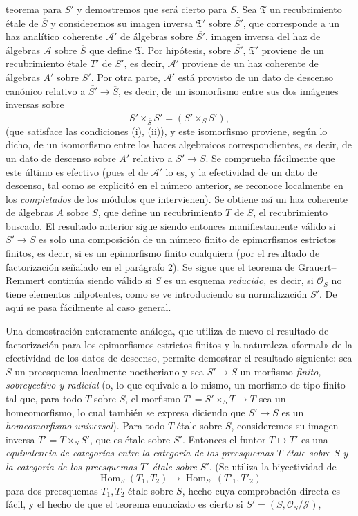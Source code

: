 teorema para $S'$ y demostremos que será cierto para $S$. Sea
$\mathfrak T$ un recubrimiento étale de $\overline S$ y consideremos su imagen
inversa $\mathfrak T'$ sobre $\overline{S'}$, que corresponde a un haz
analítico coherente $\mathcal A'$ de álgebras sobre $\overline{S'}$, imagen
inversa del haz de álgebras $\mathcal A$ sobre $\overline S$ que define
$\mathfrak T$. Por hipótesis, sobre $\overline{S'}$, $\mathfrak T'$ proviene de
un recubrimiento étale $T'$ de $S'$, es decir, $\mathcal A'$ proviene de un haz
coherente de álgebras $A'$ sobre $S'$. Por otra parte, $\mathcal A'$ está
provisto de un dato de descenso canónico relativo a
$\overline{S'}\longrightarrow\overline S$, es decir, de un isomorfismo entre
sus dos imágenes inversas sobre
\[
  \overline{S'}\times_{\overline S}\overline{S'}
  =\overline{(S'\times_SS')},
\]
(que satisface las condiciones (i), (ii)), y este isomorfismo proviene, según
lo dicho, de un isomorfismo entre los haces algebraicos correspondientes, es
decir, de un dato de descenso sobre $A'$ relativo a
$S'\longrightarrow S$. Se comprueba fácilmente que este último es efectivo
(pues el de $\mathcal A'$ lo es, y la efectividad de un dato de descenso, tal
como se explicitó en el número anterior, se reconoce localmente en los
\emph{completados} de los módulos que intervienen). Se obtiene así un haz
coherente de álgebras $A$ sobre $S$, que define un recubrimiento $T$ de $S$,
el recubrimiento buscado. El resultado anterior sigue siendo entonces
manifiestamente válido si $S'\longrightarrow S$ es solo una composición de un
número finito de epimorfismos estrictos finitos, es decir, si es un
epimorfismo finito cualquiera (por el resultado de factorización señalado en
el parágrafo 2). Se sigue que el teorema de Grauert--Remmert continúa siendo
válido si $S$ es un esquema \emph{reducido}, es decir, si $\mathcal O_S$ no
tiene elementos nilpotentes, como se ve introduciendo su normalización $S'$.
De aquí se pasa fácilmente al caso general.

Una demostración enteramente análoga, que utiliza de nuevo el resultado de
factorización para los epimorfismos estrictos finitos y la naturaleza «formal»
de la efectividad de los datos de descenso, permite demostrar el resultado
siguiente: sea $S$ un preesquema localmente noetheriano y sea
$S'\longrightarrow S$ un morfismo \emph{finito, sobreyectivo y radicial} (o,
lo que equivale a lo mismo, un morfismo de tipo finito tal que, para todo $T$
sobre $S$, el morfismo $T'=S'\times_ST\longrightarrow T$ sea un homeomorfismo,
lo cual también se expresa diciendo que $S'\longrightarrow S$ es un
\emph{homeomorfismo universal}). Para todo $T$ étale sobre $S$, consideremos
su imagen inversa $T'=T\times_SS'$, que es étale sobre $S'$. Entonces el
funtor $T\longmapsto T'$ es una \emph{equivalencia de categorías entre la
categoría de los preesquemas $T$ étale sobre $S$ y la categoría de los
preesquemas $T'$ étale sobre $S'$}. (Se utiliza la biyectividad de
\[
  \operatorname{Hom}_S(T_1,T_2)\longrightarrow
  \operatorname{Hom}_{S'}(T'_1,T'_2)
\]
para dos preesquemas $T_1,T_2$ étale sobre $S$, hecho cuya comprobación directa
es fácil, y el hecho de que el teorema enunciado es cierto si
$S'=(S,\mathcal O_S/\mathcal J)$,

